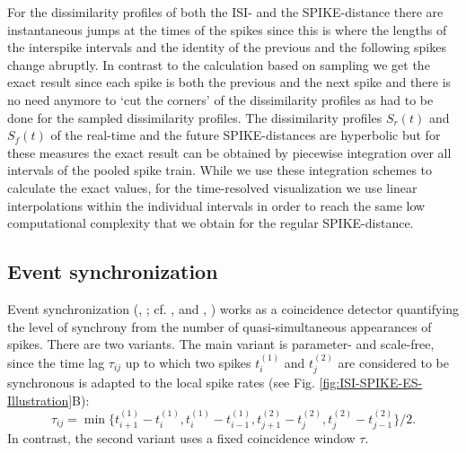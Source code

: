 \documentclass[10pt,twocolumn]{elsart5p}
\begin{document}
For the dissimilarity profiles of both the ISI- and the SPIKE-distance there are instantaneous jumps at the times of the spikes since this is where the lengths of the interspike intervals and the identity of the previous and the following spikes change abruptly. In contrast to the calculation based on sampling we get the exact result since each spike is both the previous and the next spike and there is no need anymore to `cut the corners' of the dissimilarity profiles as had to be done for the sampled dissimilarity profiles. The dissimilarity profiles $S_r(t)$ and $S_f (t)$ of the real-time and the future SPIKE-distances are hyperbolic but for these measures the exact result can be obtained by piecewise integration over all intervals of the pooled spike train. While we use these integration schemes to calculate the exact values, for the time-resolved visualization we use linear interpolations within the individual intervals in order to reach the same low computational complexity that we obtain for the regular SPIKE-distance.



\subsection{\label{ss:Event-Synchronization} Event synchronization}

Event synchronization (\citeauthor{QuianQuiroga02b}, \citeyear{QuianQuiroga02b}; cf. \citeauthor{Kreuz07c}, \citeyear{Kreuz07c} and \citeauthor{Kreuz11b}, \citeyear{Kreuz11b}) works as a coincidence detector quantifying the level of synchrony from the number of quasi-simultaneous appearances of spikes. There are two variants. The main variant is parameter- and scale-free, since the time lag $\tau_{ij}$ up to which two spikes $t_i^{(1)}$ and $t_j^{(2)}$ are considered to be synchronous is adapted to the local spike rates (see Fig. \ref{fig:ISI-SPIKE-ES-Illustration}B):
%
\begin{equation} \label{eq:Event-MaxDist}
    \tau_{ij} = \min \{t_{i+1}^{(1)} - t_i^{(1)}, t_i^{(1)} - t_{i-1}^{(1)},
                           t_{j+1}^{(2)} - t_j^{(2)}, t_j^{(2)} - t_{j-1}^{(2)}\}/2.
\end{equation}
%
In contrast, the second variant uses a fixed coincidence window $\tau$.
\end{document}
